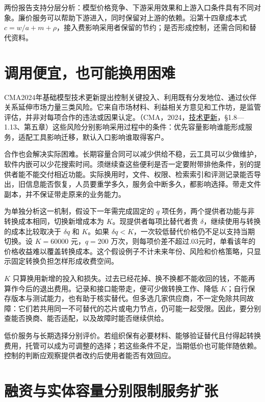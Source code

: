 \documentclass[UTF8,fontset=windows,12pt,a4paper,oneside,openany]{ctexbook}
\begin{document}
两份报告支持分层分析：模型价格竞争、下游采用效果和上游入口条件具有不同对象。廉价服务可以帮助下游进入，同时保留对上游的依赖。沿第十四章成本式$c=w/a+m+\rho$，接入费影响采用者保留的节约；是否形成控制，还需合同和替代资料。



\section{调用便宜，也可能换用困难}

CMA2024年基础模型技术更新提出控制关键投入、利用既有分发地位、通过伙伴关系延伸市场力量三类风险。它来自市场材料、利益相关方意见和工作坊，是监管评估，并非对每项合作的违法或因果认定。（CMA，2024，\href{https://assets.publishing.service.gov.uk/media/661e5a4c7469198185bd3d62/AI_Foundation_Models_technical_update_report.pdf}{技术更新}，§1.8—1.13、第五章）这些风险分别影响采用过程中的条件：优先容量影响谁能形成服务，适配工具影响迁移，默认入口影响谁取得客户。

合作也会解决实际困难。长期容量合同可以减少供给不稳，云工具可以少做维护，软件内嵌可以少花搜索时间。须继续查这些便利是否一定要附带排他条件，别的提供者能不能交付相近功能。实际换用时，文件、权限、检索索引和评测记录能否导出，旧信息能否恢复，人员要重学多久，服务会中断多久，都影响选择。带走文件副本，并不保证带走原来的业务能力。

为单独分析这一机制，假设下一年需完成固定的 $q$ 项任务，两个提供者功能与非转换成本相同，切换新增成本为 $K$。现提供者每项比替代者贵 $\delta$，继续使用与转换的成本比较取决于 $\delta q$ 和 $K$。如果 $\delta q<K$，一次较低替代价格仍不足以支持当期切换。设 $K=60000$ 元，$q=200$ 万次，则每项价差不超过.03元时，单看该年的价格收益难以覆盖转换成本。这个假设例子不计未来年份、风险和价格策略，只显示固定转换负担怎样形成收费空间。

$K$ 只算换用新增的投入和损失。过去已经花掉、换不换都不能收回的钱，不能再算作今后的退出费用。记录和接口能带走，便可少做转换工作、降低 $K$；自行保存版本与测试能力，也有助于核实替代。但多选几家供应商，不一定免除共同故障：它们若共用同一不可替代的芯片或电力节点，仍可能一起受限。因此，要分别查能否换商、能否适配，以及故障时能否继续供给。

低价服务与长期选择分别评价。若组织保有必要材料、能够验证替代且付得起转换费用，托管可以成为可调整的选择；若这些条件不足，当期低价也可能伴随依赖。控制的判断应观察提供者改约后使用者能否有效回应。

\section{融资与实体容量分别限制服务扩张}
\end{document}
